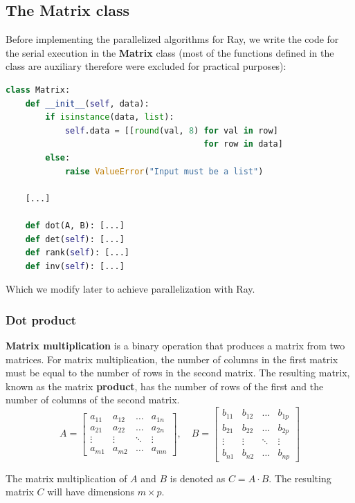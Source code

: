 \subsection{The Matrix class}
Before implementing the parallelized algorithms for Ray, we write the code for the serial execution in the \textbf{Matrix} class (most of the functions defined in the class are auxiliary therefore were excluded for practical purposes):
\begin{lstlisting}[language=Python, label=Matrix class]
class Matrix:
    def __init__(self, data):
        if isinstance(data, list):
            self.data = [[round(val, 8) for val in row]
                                        for row in data]
        else:
            raise ValueError("Input must be a list")
    
    [...]

    def dot(A, B): [...]
    def det(self): [...]
    def rank(self): [...]
    def inv(self): [...]
\end{lstlisting}
Which we modify later to achieve parallelization with Ray.

\pagebreak
\subsubsection{Dot product}
\textbf{Matrix multiplication} is a binary operation that produces a matrix from two matrices. For matrix multiplication, the number of columns in the first matrix must be equal to the number of rows in the second matrix. The resulting matrix, known as the matrix \textbf{product}, has the number of rows of the first and the number of columns of the second matrix.
$$
    A = \begin{bmatrix}
        a_{11} & a_{12} & \dots  & a_{1n} \\
        a_{21} & a_{22} & \dots  & a_{2n} \\
        \vdots & \vdots & \ddots & \vdots \\
        a_{m1} & a_{m2} & \dots  & a_{mn}
    \end{bmatrix}, \quad
    B = \begin{bmatrix}
        b_{11} & b_{12} & \dots  & b_{1p} \\
        b_{21} & b_{22} & \dots  & b_{2p} \\
        \vdots & \vdots & \ddots & \vdots \\
        b_{n1} & b_{n2} & \dots  & b_{np}
    \end{bmatrix}
$$

The matrix multiplication of $A$ and $B$ is denoted as $C = A \cdot B$. The resulting matrix $C$ will have dimensions $m \times p$.

